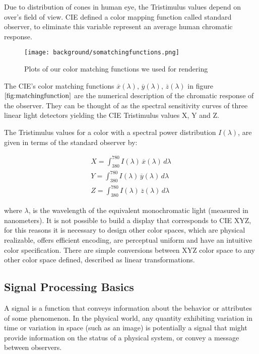 Due to distribution of cones in human eye, the Tristimulus values depend on over's field of view. CIE defined a color mapping function called standard observer, to eliminate this variable represent an average human chromatic response.

\begin{figure}[H]
  \centering
  \texttt{[image: background/somatchingfunctions.png]}
  \caption{Plots of our color matching functions we used for rendering}
  \label{fig:matchingfunction}
\end{figure}

The CIE's color matching functions $\overline{x}(\lambda)$, $\overline{y}(\lambda)$, $\overline{z}(\lambda)$ in figure $\ref{fig:matchingfunction}$ are the numerical description of the chromatic response of the observer. They can be thought of as the spectral sensitivity curves of three linear light detectors yielding the CIE Tristimulus values X, Y and Z.

The Tristimulus values for a color with a spectral power distribution $I(\lambda)$, are given in terms of the standard observer by:

\begin{align}
    X= \int_{380}^{780} I(\lambda)\,\overline{x}(\lambda)\,d\lambda \nonumber \\
    Y= \int_{380}^{780} I(\lambda)\,\overline{y}(\lambda)\,d\lambda \nonumber \\
    Z= \int_{380}^{780} I(\lambda)\,\overline{z}(\lambda)\,d\lambda
\label{eq:tristimulusvalues}
\end{align}

where $\lambda$, is the wavelength of the equivalent monochromatic light (measured in nanometers). It is not possible to build a display that corresponds to CIE XYZ, for this reasons it is necessary to design  other color spaces, which are physical realizable, offers efficient encoding, are perceptual uniform and have an intuitive color specification. There are simple conversions between XYZ color space to any other color space defined, described as linear transformations.

\subsection{Signal Processing Basics}
A signal is a function that conveys information about the behavior or attributes of some phenomenon.
In the physical world, any quantity exhibiting variation in time or variation in space (such as an image) is potentially a signal that might provide information on the status of a physical system, or convey a message between observers.

